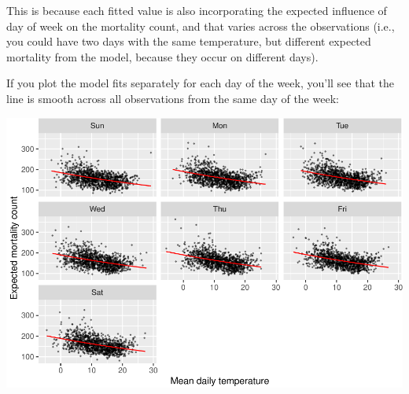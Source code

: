\documentclass[
]{book}
\newenvironment{Shaded}{\begin{snugshade}}{\end{snugshade}}
\newcommand{\AttributeTok}[1]{\textcolor[rgb]{0.77,0.63,0.00}{#1}}
\newcommand{\FloatTok}[1]{\textcolor[rgb]{0.00,0.00,0.81}{#1}}
\newcommand{\FunctionTok}[1]{\textcolor[rgb]{0.00,0.00,0.00}{#1}}
\newcommand{\NormalTok}[1]{#1}
\newcommand{\SpecialCharTok}[1]{\textcolor[rgb]{0.00,0.00,0.00}{#1}}
\newcommand{\StringTok}[1]{\textcolor[rgb]{0.31,0.60,0.02}{#1}}
\begin{document}
This is because each fitted value is also incorporating the expected influence
of day of week on the mortality count, and that varies across the observations
(i.e., you could have two days with the same temperature, but different
expected mortality from the model, because they occur on different days).

If you plot the model fits separately for each day of the week, you'll see that
the line is smooth across all observations from the same day of the week:

\begin{Shaded}
\end{Shaded}

\includegraphics{adv_epi_analysis_files/figure-latex/unnamed-chunk-41-1.pdf}
\end{document}
